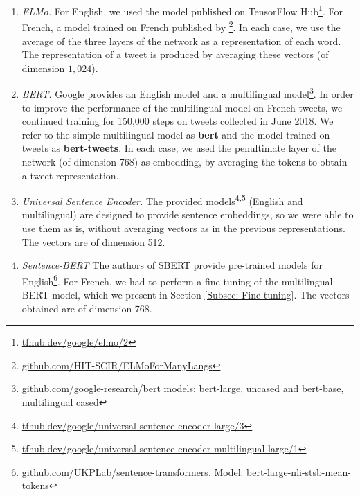 \begin{enumerate}
\item \textit{ELMo.} For English, we used the model published on TensorFlow Hub\footnote{\url{tfhub.dev/google/elmo/2}}. For French, a model trained on French published by \citet{che2018towards}\footnote{\url{github.com/HIT-SCIR/ELMoForManyLangs}}. In each case, we use the average of the three layers of the network as a representation of each word. The representation of a tweet is produced by averaging these vectors (of dimension $1,024$).


\item \textit{BERT.} Google provides an English model and a multilingual model\footnote{\url{github.com/google-research/bert} models: bert-large, uncased and bert-base, multilingual cased}. In order to improve the performance of the multilingual model on French tweets, we continued training for 150,000 steps on tweets collected in June 2018. We refer to the simple multilingual model as \textbf{bert} and the model trained on tweets as \textbf{bert-tweets}. In each case, we used the penultimate layer of the network (of dimension 768) as embedding, by averaging the tokens to obtain a tweet representation.

\item \textit{Universal Sentence Encoder.} The provided models\footnote{\url{tfhub.dev/google/universal-sentence-encoder-large/3}}\textsuperscript{,}\footnote{\url{tfhub.dev/google/universal-sentence-encoder-multilingual-large/1}}
    (English and multilingual) are designed to provide sentence embeddings, so we were able to use them as is, without averaging vectors
    as in the previous representations. The vectors are of dimension 512.

\item \textit{Sentence-BERT} The authors of SBERT provide pre-trained models for English\footnote{\url{github.com/UKPLab/sentence-transformers}. Model: bert-large-nli-stsb-mean-tokens}. For French, we had to perform a fine-tuning of the multilingual BERT model, which we present in Section \ref{Subsec: Fine-tuning}. The vectors obtained are of dimension 768.
\end{enumerate}



